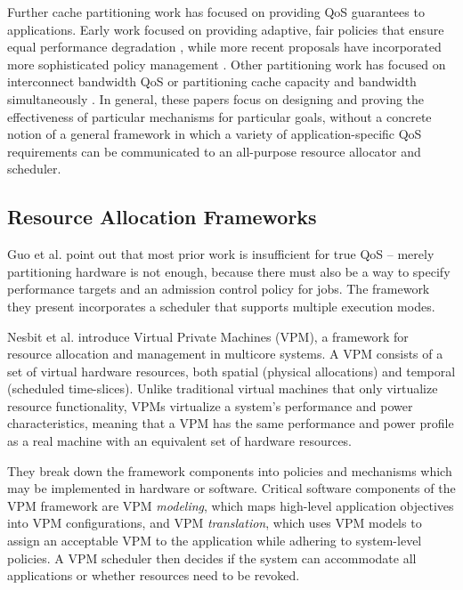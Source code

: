 Further cache partitioning work has focused on providing QoS guarantees to applications. Early work focused on providing adaptive, fair policies that ensure equal performance degradation \cite{605420,1086328}, while more recent proposals have incorporated more sophisticated policy management \cite{1241608,1331730,1152161,1254886}. Other partitioning work has focused on interconnect bandwidth QoS \cite{1382130} or partitioning cache capacity and bandwidth simultaneously \cite{1250671}. In general, these papers focus on designing and proving the effectiveness of particular mechanisms for particular goals, without a concrete notion of a general framework in which a variety of application-specific QoS requirements can be communicated to an all-purpose resource allocator and scheduler.

\subsection{Resource Allocation Frameworks}

Guo et al. \cite{1331730} point out that most prior work is insufficient for true QoS -- merely partitioning hardware is not enough, because there must also be a way to specify performance targets and an admission control policy for jobs. 
The framework they present incorporates a scheduler that supports multiple execution modes.

Nesbit et al. \cite{1436097} introduce Virtual Private Machines (VPM), a framework for resource allocation and management in multicore systems. A VPM consists of a set of virtual hardware resources, both spatial (physical allocations) and temporal (scheduled time-slices).  Unlike traditional virtual machines that only virtualize resource functionality, VPMs virtualize a system's performance and power characteristics, meaning that a VPM has the same performance and power profile as a real machine with an equivalent set of hardware resources.

They break down the framework components into policies and mechanisms which may be implemented in hardware or software. Critical software components of the VPM framework are VPM {\em modeling}, which maps high-level application objectives into VPM configurations, and VPM {\em translation}, which uses VPM models to assign an acceptable VPM to the application while adhering to system-level policies. A VPM scheduler then decides if the system can accommodate all applications or whether resources need to be revoked.

